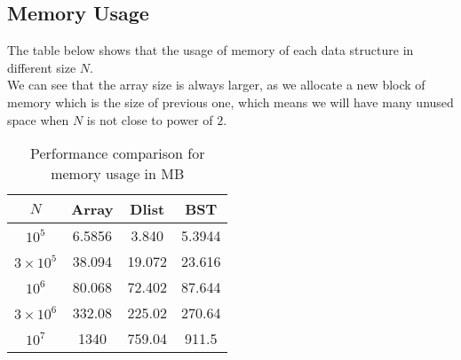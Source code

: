 \documentclass{article}
\begin{document}
	\subsection{Memory Usage}
	The table below shows that the usage of memory of each data structure in different size $N$. \\
	We can see that the array size is always larger, as we allocate a new block of memory which is the size of previous one, which means we will have many unused space when $N$ is not close to power of $2$.
		
	\begin{table}[h]
	\begin{center}
	\begin{tabular}{|c|c|c|c|}
	\hline 
	$N$ & Array & Dlist & BST \\ 
	\hline 
	$10^5$ & 6.5856 & 3.840 & 5.3944 \\ 
	\hline 
	$3 \times 10^5$ & 38.094 & 19.072 & 23.616 \\ 
	\hline 
	$10^6$ & 80.068 & 72.402 & 87.644 \\ 
	\hline 
	$3 \times 10^6$ & 332.08 & 225.02 & 270.64 \\ 
	\hline 
	$10^7$ & 1340 & 759.04 & 911.5 \\ 
	\hline 
	\end{tabular} 
	
	\end{center}
	\caption{Performance comparison for memory usage in MB}
	\end{table}
	
	
\end{document}
